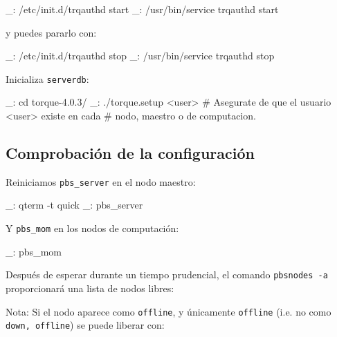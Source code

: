 \begin{bashcode}
_: /etc/init.d/trqauthd start
_: /usr/bin/service trqauthd start
\end{bashcode}

y puedes pararlo con:

\begin{bashcode}
_: /etc/init.d/trqauthd stop
_: /usr/bin/service trqauthd stop
\end{bashcode}

Inicializa \texttt{serverdb}:

\begin{bashcode}
_: cd torque-4.0.3/
_: ./torque.setup <user>   # Asegurate de que el usuario <user> existe en cada
                           # nodo, maestro o de computacion.
\end{bashcode}


\subsection{Comprobación de la configuración}


Reiniciamos \texttt{pbs\_server} en el nodo maestro:

\begin{bashcode}
_: qterm -t quick
_: pbs_server
\end{bashcode}

Y \texttt{pbs\_mom} en los nodos de computación:

\begin{bashcode}
_: pbs_mom
\end{bashcode}

Después de esperar durante un tiempo prudencial, el comando \texttt{pbsnodes -a} proporcionará una lista de nodos libres:


Nota: Si el nodo aparece como \texttt{offline}, y únicamente \texttt{offline} (i.e. no como \texttt{down, offline}) se puede liberar con:

